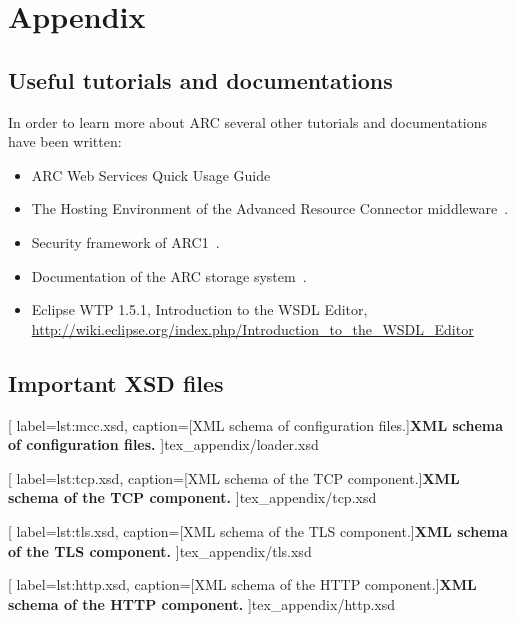 \chapter{Appendix}

\section{Useful tutorials and documentations}

In order to learn more about ARC several other tutorials and documentations have been written:
\begin{itemize}
 \item ARC Web Services Quick Usage Guide~\cite{2008_UNKNOWN}
 \item The Hosting Environment of the Advanced Resource Connector middleware~\cite{2008_Cameron}.
 \item Security framework of ARC1~\cite{QIANG_2008}.
 \item Documentation of the ARC storage system~\cite{Nagy_2008}.
 \item Eclipse WTP 1.5.1, Introduction to the WSDL Editor, \url{http://wiki.eclipse.org/index.php/Introduction_to_the_WSDL_Editor}


\end{itemize}




\section{Important XSD files}\label{sec:impXSD}


	[
	label=lst:mcc.xsd,
	caption={[XML schema of configuration files.]\textbf{XML schema of configuration files.}}
	]{tex_appendix/loader.xsd}


	[
	label=lst:tcp.xsd,
	caption={[XML schema of the TCP component.]\textbf{XML schema of the TCP component.}}
	]{tex_appendix/tcp.xsd}


	[
	label=lst:tls.xsd,
	caption={[XML schema of the TLS component.]\textbf{XML schema of  the TLS component.}}
	]{tex_appendix/tls.xsd}


	[
	label=lst:http.xsd,
	caption={[XML schema of the HTTP component.]\textbf{XML schema of the HTTP component.}}
	]{tex_appendix/http.xsd}









